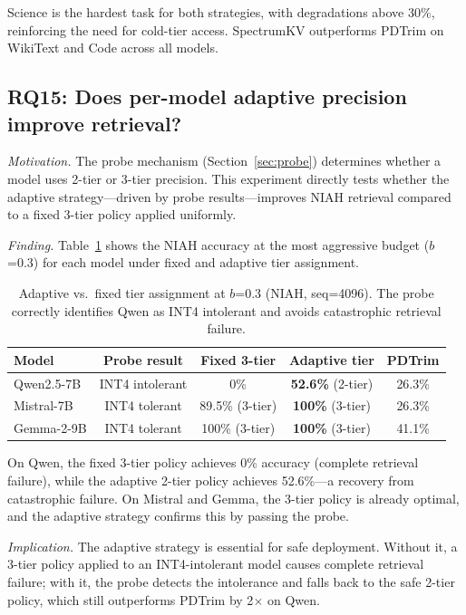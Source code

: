\documentclass[11pt]{article}
\newcommand{\method}{SpectrumKV}
\newcommand{\pct}{\%}
\theoremstyle{definition}
\theoremstyle{plain}
\begin{document}
Science is the hardest task for both strategies, with degradations above 30\pct{}, reinforcing the need for cold-tier access.  \method{} outperforms PDTrim on WikiText and Code across all models.

\subsection{RQ15: Does per-model adaptive precision improve retrieval?}
\label{sec:rq15}

\emph{Motivation.}  The probe mechanism (Section~\ref{sec:probe}) determines whether a model uses 2-tier or 3-tier precision.  This experiment directly tests whether the adaptive strategy---driven by probe results---improves NIAH retrieval compared to a fixed 3-tier policy applied uniformly.

\emph{Finding.}  Table~\ref{tab:adaptive-niah} shows the NIAH accuracy at the most aggressive budget ($b$=0.3) for each model under fixed and adaptive tier assignment.

\begin{table}[t]
\centering
\caption{Adaptive vs.\ fixed tier assignment at $b$=0.3 (NIAH, seq=4096).  The probe correctly identifies Qwen as INT4 intolerant and avoids catastrophic retrieval failure.}
\label{tab:adaptive-niah}
\small
\begin{tabular}{lcccc}
\toprule
Model & Probe result & Fixed 3-tier & Adaptive tier & PDTrim \\
\midrule
Qwen2.5-7B & INT4 intolerant & 0\pct{} & \textbf{52.6\pct{}} (2-tier) & 26.3\pct{} \\
Mistral-7B & INT4 tolerant & 89.5\pct{} (3-tier) & \textbf{100\pct{}} (3-tier) & 26.3\pct{} \\
Gemma-2-9B & INT4 tolerant & 100\pct{} (3-tier) & \textbf{100\pct{}} (3-tier) & 41.1\pct{} \\
\bottomrule
\end{tabular}
\end{table}

On Qwen, the fixed 3-tier policy achieves 0\pct{} accuracy (complete retrieval failure), while the adaptive 2-tier policy achieves 52.6\pct{}---a recovery from catastrophic failure.  On Mistral and Gemma, the 3-tier policy is already optimal, and the adaptive strategy confirms this by passing the probe.

\emph{Implication.}  The adaptive strategy is essential for safe deployment.  Without it, a 3-tier policy applied to an INT4-intolerant model causes complete retrieval failure; with it, the probe detects the intolerance and falls back to the safe 2-tier policy, which still outperforms PDTrim by 2$\times$ on Qwen.
\end{document}
